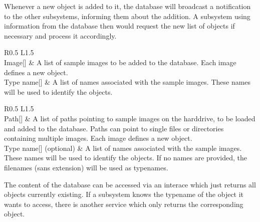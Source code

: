 Whenever a new object is added to it, the database will broadcast a notification to the other subsystems, informing them about the addition. A subsystem using information from the database then would request the new list of objects if necessary and process it accordingly. \\

\begin{table}[H]
  \centering
  \caption[Database add-images interface]{Images can be provided through this interface to add new objects to the database.}
  \label{tab:db-add-images}
  \renewcommand{\arraystretch}{1.5}
  \begin{tabularx}{\textwidth}{R{0.5} L{1.5}}
    \hline
     \\
    \hline
    Image[]     & A list of sample images to be added to the database. Each image defines a new object. \\
    Type name[] & A list of names associated with the sample images. These names will be used to identify the objects. \\
    \hline
  \end{tabularx}
\end{table}

\begin{table}[H]
  \centering
  \caption[Database add-files interface]{Paths to image files can be provided through this interface to add new objects to the database.}
  \label{tab:db-add-files}
  \renewcommand{\arraystretch}{1.5}
  \begin{tabularx}{\textwidth}{R{0.5} L{1.5}}
    \hline
     \\
    \hline
    Path[]                 & A list of paths pointing to sample images on the harddrive, to be loaded and added to the database. Paths can point to single files or directories containing multiple images. Each image defines a new object. \\
    Type name[] (optional) & A list of names associated with the sample images. These names will be used to identify the objects. If no names are provided, the filenames (sans extension) will be used as typenames. \\
    \hline
  \end{tabularx}
\end{table}

The content of the database can be accessed via an interace which just returns all objects currently existing. If a subsystem knows the typename of the object it wants to access, there is another service which only returns the corresponding object. \\

